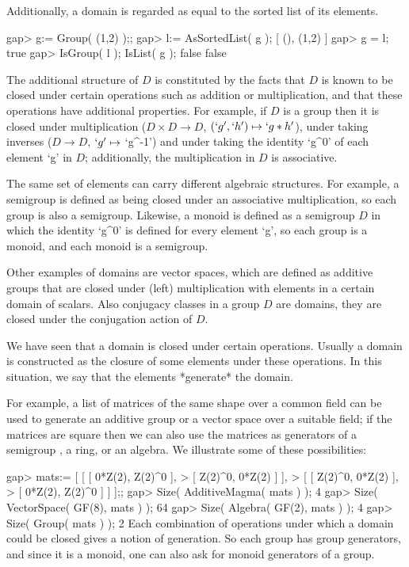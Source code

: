 Additionally, a domain is regarded as equal to the sorted list
of its elements.

\beginexample
gap> g:= Group( (1,2) );;
gap> l:= AsSortedList( g );
[ (), (1,2) ]
gap> g = l;
true
gap> IsGroup( l ); IsList( g );
false
false
\endexample



The additional structure of $D$ is constituted by the facts that $D$ is
known to be closed under certain operations such as addition or
multiplication, and that these operations have additional properties.
For example, if $D$ is a group then it is closed under multiplication
($D \times D \rightarrow D$, $(`g',`h') \mapsto `g * h'$),
under taking inverses ($D \rightarrow D$, $`g' \mapsto$ `g^-1')
and under taking the identity `g^0' of each element `g' in $D$;
additionally, the multiplication in $D$ is associative.

The same set of elements can carry different algebraic structures.
For example, a semigroup is defined as being closed under an associative
multiplication, so each group is also a semigroup.
Likewise, a monoid is defined as a semigroup $D$ in which the identity
`g^0' is defined for every element `g', so each group is a monoid,
and each monoid is a semigroup.

Other examples of domains are vector spaces, which are defined as
additive groups that are closed under (left) multiplication with elements
in a certain domain of scalars.
Also conjugacy classes in a group $D$ are domains,
they are closed under the conjugation action of $D$.



We have seen that a domain is closed under certain operations.
Usually a domain is constructed as the closure of some elements under
these operations.
In this situation, we say that the elements *generate* the domain.

For example, a list of matrices of the same shape over a common field
can be used to generate an additive group or a vector space over a
suitable field; if the matrices are square then we can also use the
matrices as generators of a semigroup , a ring, or an algebra. We
illustrate some of these possibilities:

\beginexample
gap> mats:= [ [ [ 0*Z(2), Z(2)^0 ],
>               [ Z(2)^0, 0*Z(2) ] ], 
>             [ [ Z(2)^0, 0*Z(2) ],
>               [ 0*Z(2), Z(2)^0 ] ] ];;
gap> Size( AdditiveMagma( mats ) );
4
gap> Size( VectorSpace( GF(8), mats ) );
64
gap> Size( Algebra( GF(2), mats ) );    
4
gap> Size( Group( mats ) );         
2
\endexample
Each combination of operations under which a domain could be closed
gives a notion of generation.
So each group has group generators, and since it is a monoid,
one can also ask for monoid generators of a group.

